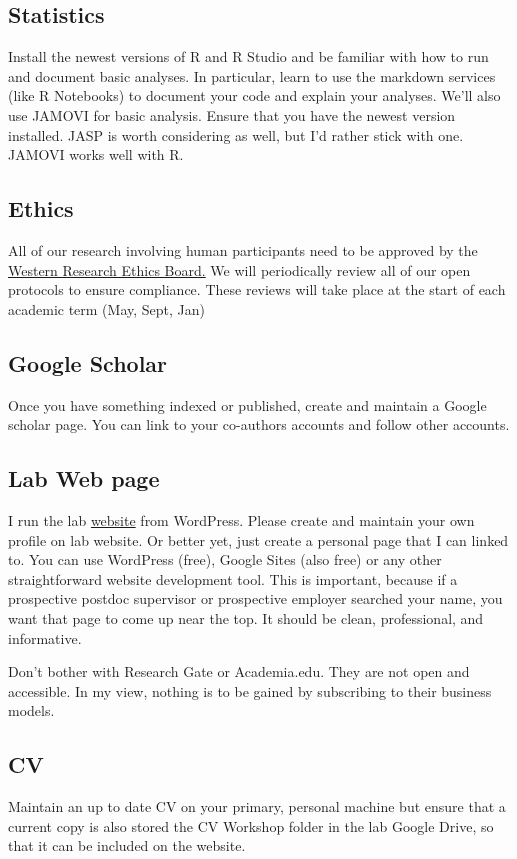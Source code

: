 \documentclass{article}
\begin{document}
\subsection{Statistics}
Install the newest versions of R and R Studio and be familiar with how to run and document basic analyses. In particular, learn to use the markdown services (like R Notebooks) to document your code and explain your analyses. We’ll also use JAMOVI for basic analysis. Ensure that you have the newest version installed. JASP is worth considering as well, but I’d rather stick with one. JAMOVI works well with R.

\subsection{Ethics}\label{sec:Ethics}
All of our research involving human participants need to be approved by the \href{http://www.uwo.ca/research/services/ethics/index.html}{Western Research Ethics Board.} We will periodically review all of our open protocols to ensure compliance. These reviews will take place at the start of each academic term (May, Sept, Jan)

\subsection{Google Scholar}
Once you have something indexed or published, create and maintain a Google scholar page. You can link to your co-authors accounts and follow other accounts.

\subsection{Lab Web page}
I run the lab \href{http://mindalab.worpress.com}{website} from WordPress. Please create and maintain your own profile on lab website. Or better yet, just create a personal page that I can linked to. You can use WordPress (free), Google Sites (also free) or any other straightforward website development tool. This is important, because if a prospective postdoc supervisor or prospective employer searched your name, you want that page to come up near the top. It should be clean, professional, and informative.

Don't bother with Research Gate or Academia.edu. They are not open and accessible. In my view, nothing is to be gained by subscribing to their business models.

\subsection{CV}
Maintain an up to date CV on your primary, personal machine but ensure that a current copy is also stored the CV Workshop folder in the lab Google Drive, so that it can be included on the website. 
\end{document}
